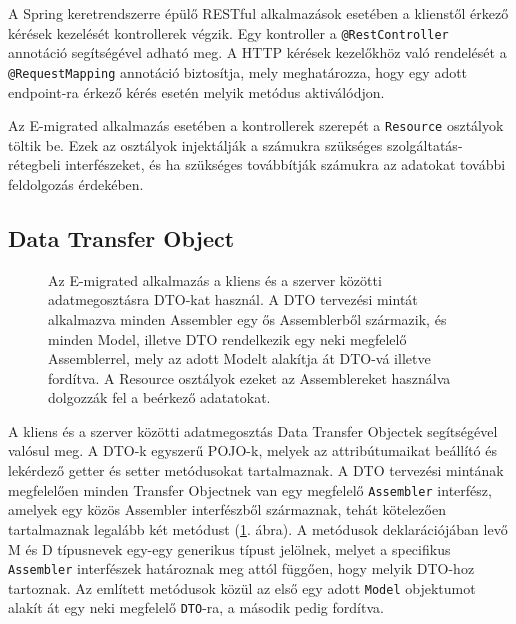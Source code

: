 A Spring keretrendszerre épülő RESTful alkalmazások esetében a klienstől érkező kérések kezelését kontrollerek végzik. Egy kontroller a \texttt{@RestController}
annotáció segítségével adható meg. A HTTP kérések kezelőkhöz való rendelését a \texttt{@RequestMapping} annotáció biztosítja, mely meghatározza, hogy egy adott endpoint-ra érkező kérés esetén melyik metódus aktiválódjon.

Az E-migrated alkalmazás esetében a kontrollerek szerepét a \texttt{Resource} osztályok töltik be. Ezek az osztályok injektálják a számukra szükséges szolgáltatás-rétegbeli interfészeket, és ha szükséges továbbítják számukra az adatokat további feldolgozás érdekében.



\subsection{Data Transfer Object}
\label{subsubsec:DTO}
\begin{figure}[!b]
  \centering
  \caption{Az E-migrated alkalmazás a kliens és a szerver közötti adatmegosztásra DTO-kat használ. A DTO tervezési mintát alkalmazva minden Assembler egy ős Assemblerből származik, és minden Model, illetve DTO rendelkezik egy neki megfelelő Assemblerrel, mely az adott Modelt alakítja át DTO-vá illetve fordítva. A Resource osztályok ezeket az Assemblereket használva dolgozzák fel a beérkező adatatokat. }
  \label{fig:Assembler}
\end{figure}

A kliens és a szerver közötti adatmegosztás Data Transfer Objectek segítségével valósul meg. A DTO-k egyszerű POJO-k, melyek az attribútumaikat beállító és lekérdező getter és setter metódusokat tartalmaznak. A DTO tervezési mintának \cite{DTO} megfelelően minden Transfer Objectnek van egy megfelelő \texttt{Assembler} interfész, amelyek egy közös Assembler interfészből származnak, tehát kötelezően tartalmaznak legalább két metódust (\ref{fig:Assembler}. ábra). A metódusok deklarációjában levő M és D típusnevek egy-egy generikus típust jelölnek, melyet a specifikus \texttt{Assembler} interfészek határoznak meg attól függően, hogy melyik DTO-hoz tartoznak. Az említett metódusok közül az első egy adott \texttt{Model} objektumot alakít át egy neki megfelelő \texttt{DTO}-ra, a második pedig fordítva. 


